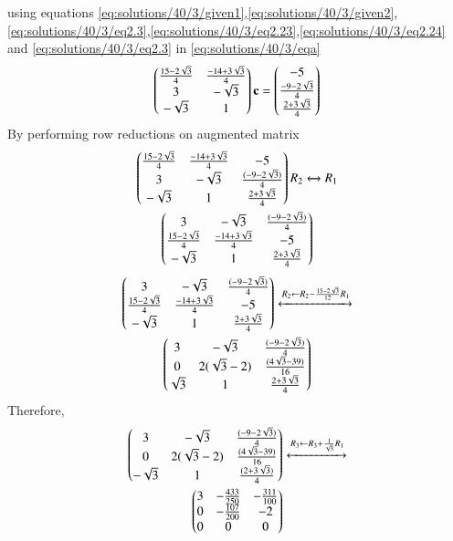 using equations \eqref{eq:solutions/40/3/given1},\eqref{eq:solutions/40/3/given2},\eqref{eq:solutions/40/3/eq2.3},\eqref{eq:solutions/40/3/eq2.23},\eqref{eq:solutions/40/3/eq2.24} and \eqref{eq:solutions/40/3/eq2.3} in \eqref{eq:solutions/40/3/eqa}
\begin{align}
    \begin{pmatrix}\frac{15-2\sqrt{3}}{4}&\frac{-14+3\sqrt{3}}{4}\\3 & -\sqrt{3}\\ -\sqrt{3}& 1\end{pmatrix}\mathbf{c} =\begin{pmatrix} -5\\\frac{-9-2\sqrt{3}}{4}\\ \frac{2+3\sqrt{3}}{4}\end{pmatrix}\label{eq:solutions/40/3/eqcen}
\end{align}
By performing row reductions on augmented matrix
\begin{multline}
\begin{pmatrix}\frac{15-2\sqrt{3}}{4}&\frac{-14+3\sqrt{3}}{4}&-5\\3 & -\sqrt{3}&\frac{(-9-2\sqrt{3})}{4}\\ -\sqrt{3}& 1&\frac{2+3\sqrt{3}}{4}\end{pmatrix}{R_2\xleftrightarrow[]{}{R_1}}\\
\begin{pmatrix}3 & -\sqrt{3}&\frac{(-9-2\sqrt{3})}{4}\\\frac{15-2\sqrt{3}}{4}&\frac{-14+3\sqrt{3}}{4}&-5\\-\sqrt{3}& 1&\frac{2+3\sqrt{3}}{4} \end{pmatrix}
\end{multline}
\begin{multline}
\begin{pmatrix}3 & -\sqrt{3}&\frac{(-9-2\sqrt{3})}{4}\\\frac{15-2\sqrt{3}}{4}&\frac{-14+3\sqrt{3}}{4}&-5\\-\sqrt{3}& 1&\frac{2+3\sqrt{3}}{4}\end{pmatrix}
\xleftrightarrow[]{R_2\leftarrow R_2-\frac{15-2\sqrt{3}}{12}R_1}\\
\begin{pmatrix}3 & -\sqrt{3}&\frac{(-9-2\sqrt{3})}{4}\\0 & 2(\sqrt{3}-2) & \frac{(4\sqrt{3}-39)}{16}\\\sqrt{3}& 1&\frac{2+3\sqrt{3}}{4}\end{pmatrix}
\end{multline}
Therefore, 
\begin{multline}
 \begin{pmatrix}3 & -\sqrt{3}&\frac{(-9-2\sqrt{3})}{4}\\0&2(\sqrt{3}-2)&\frac{(4\sqrt{3}-39)}{16}\\-\sqrt{3}& 1&\frac{(2+3\sqrt{3})}{4}\end{pmatrix}\xleftrightarrow[]{R_3\leftarrow R_3+\frac{1}{\sqrt{3}}R_1}\\
\begin{pmatrix}3 & -\frac{433}{250}&-\frac{311}{100}\\0 & -\frac{107}{200} & -2\\0& 0&0\end{pmatrix}
\end{multline}
